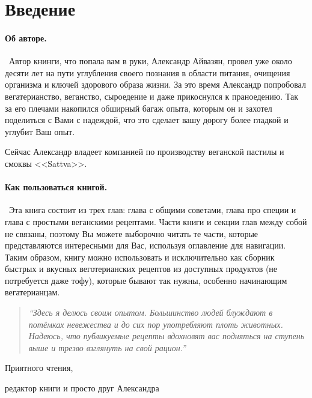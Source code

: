 \section{Введение}

\paragraph{Об авторе.}\
Автор книнги, что попала вам в руки, Александр Айвазян, провел уже около десяти лет на пути углубления своего познания в области питания, очищения организма и ключей здорового образа жизни. За это время Александр попробовал вегатерианство, веганство, сыроедение и даже прикоснулся к праноедению. Так за его плечами накопился обширный багаж опыта, которым он и захотел поделиться с Вами с надеждой, что это сделает вашу дорогу более гладкой и углубит Ваш опыт.  

Сейчас Александр владеет компанией по производству веганской пастилы и смоквы <<Sattva>>.
\paragraph{Как пользоваться книгой.}\ 
Эта книга состоит из трех глав: глава с общими советами, глава про специи и глава с простыми веганскими рецептами. Части книги и секции глав между собой не связаны, поэтому Вы можете выборочно читать те части, которые представляются интересными для Вас, используя оглавление для навигации. Таким образом, книгу можно использовать и исключительно как сборник быстрых и вкусных веготерианских рецептов из доступных продуктов (не потребуется даже тофу), которые бывают так нужны, особенно начинающим вегатерианцам.

\begin{quote}
\textit{``Здесь я делюсь своим опытом. Большинство людей блуждают в потёмках невежества и до сих пор употребляют плоть животных. Надеюсь, что публикуемые рецепты вдохновят вас подняться на ступень выше и трезво взглянуть на свой рацион.''
\\[5pt]
\rightline{\textbf{--- Александр Айвазян}}}
\end{quote}

Приятного чтения,

редактор книги и просто друг Александра
